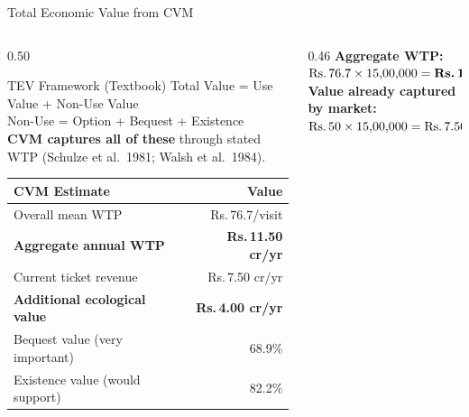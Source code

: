 \documentclass[10pt, aspectratio=169]{beamer}
\newcommand{\rupee}{\textrm{Rs.}\,}
\begin{document}
\begin{frame}[shrink=5]{Total Economic Value from CVM}
    \begin{columns}[T]
        \begin{column}{0.50\textwidth}
            \begin{block}{TEV Framework (Textbook)}
                \small
                Total Value = Use Value + Non-Use Value\\[3pt]
                Non-Use = Option + Bequest + Existence\\[6pt]
                \textbf{CVM captures all of these} through stated WTP (Schulze et al.\ 1981; Walsh et al.\ 1984).
            \end{block}

            \vspace{0.3em}
            \begin{table}
                \centering
                \small
                \begin{tabular}{@{}lr@{}}
                    \toprule
                    \textbf{CVM Estimate} & \textbf{Value} \\
                    \midrule
                    Overall mean WTP & \rupee 76.7/visit \\
                    \textbf{Aggregate annual WTP} & \textbf{\rupee 11.50 cr/yr} \\
                    \midrule
                    Current ticket revenue & \rupee 7.50 cr/yr \\
                    \textbf{Additional ecological value} & \textbf{\rupee 4.00 cr/yr} \\
                    \midrule
                    Bequest value (very important) & 68.9\% \\
                    Existence value (would support) & 82.2\% \\
                    \bottomrule
                \end{tabular}
            \end{table}
        \end{column}
        \begin{column}{0.46\textwidth}
            \scriptsize
            \textbf{Aggregate WTP:}\\
            $\text{\rupee}76.7 \times 15{,}00{,}000 = \textbf{\rupee 11.50 \text{ crore/year}}$\\[4pt]
            \textbf{Value already captured by market:}\\
            $\text{\rupee}50 \times 15{,}00{,}000 = \text{\rupee}7.50\text{ crore (ticket revenue)}$\\[4pt]

\end{column}
\end{columns}
\end{frame}
\end{document}
